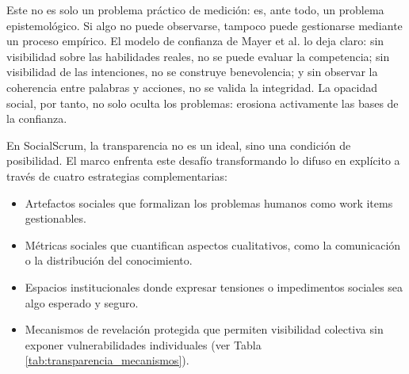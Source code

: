 Este no es solo un problema práctico de medición: es, ante todo, un problema epistemológico.
Si algo no puede observarse, tampoco puede gestionarse mediante un proceso empírico.
El modelo de confianza de Mayer et al. \cite{mayer_integrative_1995} lo deja claro: sin visibilidad sobre las habilidades reales, no se puede evaluar la competencia; sin visibilidad de las intenciones, no se construye benevolencia; y sin observar la coherencia entre palabras y acciones, no se valida la integridad.
La opacidad social, por tanto, no solo oculta los problemas: erosiona activamente las bases de la confianza.

En SocialScrum, la transparencia no es un ideal, sino una condición de posibilidad.
El marco enfrenta este desafío transformando lo difuso en explícito a través de cuatro estrategias complementarias:
\begin{itemize}
    \item Artefactos sociales que formalizan los problemas humanos como work items gestionables.
    \item Métricas sociales que cuantifican aspectos cualitativos, como la comunicación o la distribución del conocimiento.
    \item Espacios institucionales donde expresar tensiones o impedimentos sociales sea algo esperado y seguro.
    \item Mecanismos de revelación protegida que permiten visibilidad colectiva sin exponer vulnerabilidades individuales (ver Tabla \ref{tab:transparencia_mecanismos}).
\end{itemize}

